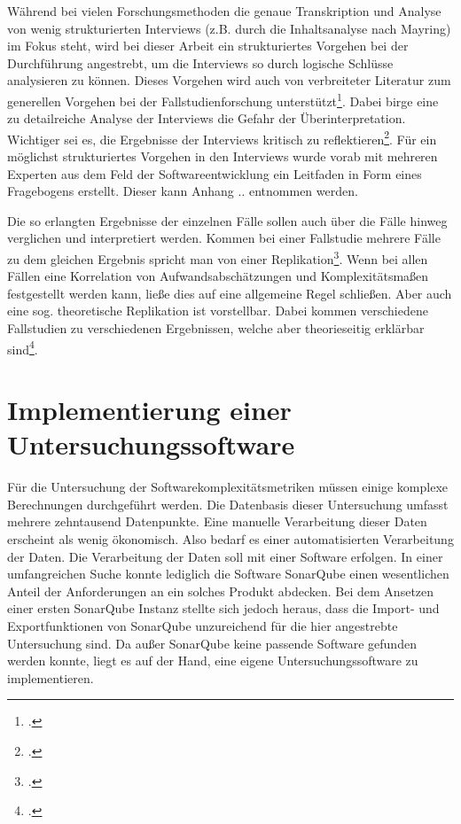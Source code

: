 Während bei vielen Forschungsmethoden die genaue Transkription und
Analyse von wenig strukturierten Interviews (z.B. durch die
Inhaltsanalyse nach Mayring) im Fokus steht, wird bei dieser Arbeit ein
strukturiertes Vorgehen bei der Durchführung angestrebt, um die
Interviews so durch logische Schlüsse analysieren zu können. Dieses
Vorgehen wird auch von verbreiteter Literatur zum generellen Vorgehen
bei der Fallstudienforschung unterstützt\footcite[][S. 12]{gothlichFallstudienAlsForschungsmethode2003}. Dabei birge eine zu
detailreiche Analyse der Interviews die Gefahr der Überinterpretation.
Wichtiger sei es, die Ergebnisse der Interviews kritisch zu reflektieren\footcite[][S. 12]{gothlichFallstudienAlsForschungsmethode2003}. Für ein möglichst
strukturiertes Vorgehen in den Interviews wurde vorab mit mehreren
Experten aus dem Feld der Softwareentwicklung ein Leitfaden in Form
eines Fragebogens erstellt. Dieser kann Anhang .. entnommen werden.

Die so erlangten Ergebnisse der einzelnen Fälle sollen auch über die
Fälle hinweg verglichen und interpretiert werden. Kommen bei einer
Fallstudie mehrere Fälle zu dem gleichen Ergebnis spricht man von einer
Replikation\footcite[Vgl. [S. 11]{gothlichFallstudienAlsForschungsmethode2003}. Wenn
bei allen Fällen eine Korrelation von Aufwandsabschätzungen und
Komplexitätsmaßen festgestellt werden kann, ließe dies auf eine
allgemeine Regel schließen. Aber auch eine sog. theoretische Replikation
ist vorstellbar. Dabei kommen verschiedene Fallstudien zu verschiedenen
Ergebnissen, welche aber theorieseitig erklärbar sind\footcite[][S. 11]{gothlichFallstudienAlsForschungsmethode2003}.

\section{Implementierung einer
Untersuchungssoftware}\label{implementierung-einer-untersuchungssoftware}

Für die Untersuchung der Softwarekomplexitätsmetriken müssen einige
komplexe Berechnungen durchgeführt werden. Die Datenbasis dieser
Untersuchung umfasst mehrere zehntausend Datenpunkte. Eine manuelle
Verarbeitung dieser Daten erscheint als wenig ökonomisch. Also bedarf es
einer automatisierten Verarbeitung der Daten. Die Verarbeitung der Daten
soll mit einer Software erfolgen. In einer umfangreichen Suche konnte
lediglich die Software SonarQube einen wesentlichen Anteil der
Anforderungen an ein solches Produkt abdecken. Bei dem Ansetzen einer
ersten SonarQube Instanz stellte sich jedoch heraus, dass die Import-
und Exportfunktionen von SonarQube unzureichend für die hier angestrebte
Untersuchung sind. Da außer SonarQube keine passende Software gefunden
werden konnte, liegt es auf der Hand, eine eigene Untersuchungssoftware
zu implementieren.

